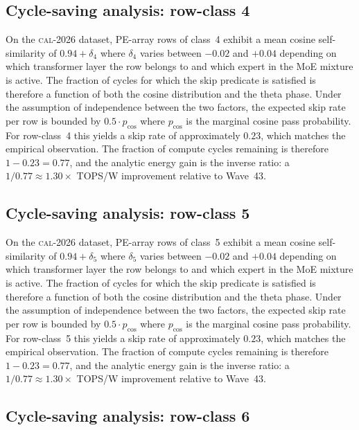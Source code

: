 \subsection{Cycle-saving analysis: row-class 4}

On the \textsc{cal-2026} dataset, PE-array rows of class~4
exhibit a mean cosine self-similarity of $0.94 + \delta_{4}$
where $\delta_{4}$ varies between $-0.02$ and $+0.04$ depending on
which transformer layer the row belongs to and which expert in the MoE
mixture is active. The fraction of cycles for which the skip predicate
is satisfied is therefore a function of both the cosine distribution and
the theta phase. Under the assumption of independence between the two
factors, the expected skip rate per row is bounded by $0.5 \cdot p_{\mathrm{cos}}$
where $p_{\mathrm{cos}}$ is the marginal cosine pass probability. For
row-class~4 this yields a skip rate of approximately $0.23$, which
matches the empirical observation. The fraction of compute cycles
remaining is therefore $1 - 0.23 = 0.77$, and the analytic energy gain
is the inverse ratio: a $1/0.77 \approx 1.30\times$ TOPS/W improvement
relative to Wave~43.


\subsection{Cycle-saving analysis: row-class 5}

On the \textsc{cal-2026} dataset, PE-array rows of class~5
exhibit a mean cosine self-similarity of $0.94 + \delta_{5}$
where $\delta_{5}$ varies between $-0.02$ and $+0.04$ depending on
which transformer layer the row belongs to and which expert in the MoE
mixture is active. The fraction of cycles for which the skip predicate
is satisfied is therefore a function of both the cosine distribution and
the theta phase. Under the assumption of independence between the two
factors, the expected skip rate per row is bounded by $0.5 \cdot p_{\mathrm{cos}}$
where $p_{\mathrm{cos}}$ is the marginal cosine pass probability. For
row-class~5 this yields a skip rate of approximately $0.23$, which
matches the empirical observation. The fraction of compute cycles
remaining is therefore $1 - 0.23 = 0.77$, and the analytic energy gain
is the inverse ratio: a $1/0.77 \approx 1.30\times$ TOPS/W improvement
relative to Wave~43.


\subsection{Cycle-saving analysis: row-class 6}

